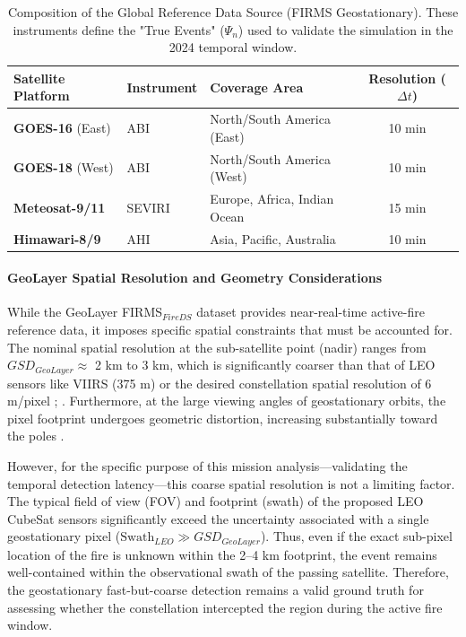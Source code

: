 \begin{table}
\centering
\caption{\footnotesize{Composition of the Global Reference Data Source (FIRMS Geostationary). These instruments define the "True Events" ($\Psi_n$) used to validate the simulation in the 2024 temporal window.}}
\label{tab:geo_satellites}
\renewcommand{\arraystretch}{1.2}
\begin{tabular}{l l l c}
\toprule
\textbf{Satellite Platform} & \textbf{Instrument} & \textbf{Coverage Area} & \textbf{Resolution ($\Delta t$)} \\
\midrule
\textbf{GOES-16} (East) & ABI & North/South America (East) & 10 min \\
\textbf{GOES-18} (West) & ABI & North/South America (West) & 10 min \\
\textbf{Meteosat-9/11} & SEVIRI & Europe, Africa, Indian Ocean & 15 min \\
\textbf{Himawari-8/9} & AHI & Asia, Pacific, Australia & 10 min \\
\bottomrule
\end{tabular}
\end{table}


\paragraph{GeoLayer Spatial Resolution and Geometry Considerations} 
\label{sec:geolayer_spatial_and_temporal_resolution}

While the GeoLayer FIRMS$_{FireDS}$ dataset provides near-real-time active-fire reference data, it imposes specific spatial constraints that must be accounted for. The nominal spatial resolution at the sub-satellite point (nadir) ranges from $GSD_{GeoLayer} \approx$ 2 km to 3 km, which is significantly coarser than that of LEO sensors like VIIRS (375 m) or the desired constellation spatial resolution of 6 m/pixel ; . Furthermore, at the large viewing angles of geostationary orbits, the pixel footprint undergoes geometric distortion, increasing substantially toward the poles \cite{davies_geostationary_2024}.

However, for the specific purpose of this mission analysis—validating the temporal detection latency—this coarse spatial resolution is not a limiting factor. The typical field of view (FOV) and footprint (swath) of the proposed LEO CubeSat sensors significantly exceed the uncertainty associated with a single geostationary pixel ($\text{Swath}_{LEO} \gg GSD_{GeoLayer}$). Thus, even if the exact sub-pixel location of the fire is unknown within the 2–4 km footprint, the event remains well-contained within the observational swath of the passing satellite. Therefore, the geostationary fast-but-coarse detection remains a valid ground truth for assessing whether the constellation intercepted the region during the active fire window.

